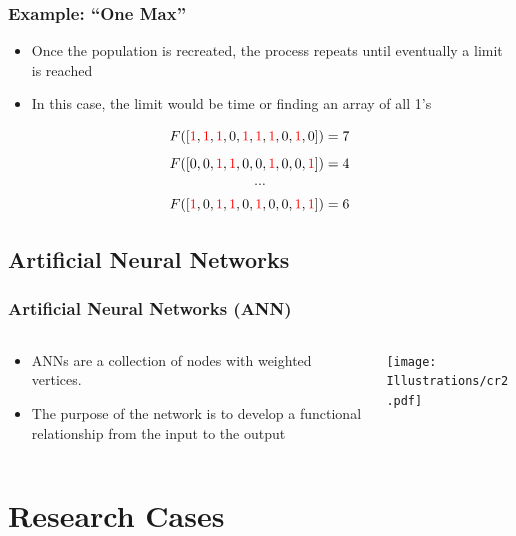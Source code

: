 \documentclass{beamer}
\begin{document}
\begin{frame}
  \frametitle{Example: ``One Max''}
\begin{itemize}
  \item Once the population is recreated, the process repeats until eventually a limit is reached
  \item In this case, the limit would be time or finding an array of all 1's
\end{itemize}
\[
F([ \textcolor{red}{1},  \textcolor{red}{1}, \textcolor{red}{1}, 0, \textcolor{red}{1}, \textcolor{red}{1}, \textcolor{red}{1}, 0, \textcolor{red}{1}, 0 ]) = 7
\]
\[F([  0, 0, \textcolor{red}{1}, \textcolor{red}{1}, 0,  0, \textcolor{red}{1}, 0, 0, \textcolor{red}{1} ]) = 4
\]
\[\cdots\]
\[F([  \textcolor{red}{1}, 0, \textcolor{red}{1}, \textcolor{red}{1}, 0,  \textcolor{red}{1}, 0, 0, \textcolor{red}{1}, \textcolor{red}{1} ]) = 6
\]
\end{frame}

\subsection{Artificial Neural Networks}
\begin{frame}
  \frametitle{Artificial Neural Networks (ANN)}
\begin{columns}
  \begin{column}{0.5\textwidth}
\begin{itemize}
\item  ANNs are a collection of nodes with weighted vertices.
\item The purpose of the network is to develop a functional relationship from the input to the output
\end{itemize}
\end{column}
\begin{column}{0.5\textwidth}
 \texttt{[image: Illustrations/cr2.pdf]}
       \\
\end{column}
\end{columns}
\end{frame}

\section{Research Cases}
\end{document}
